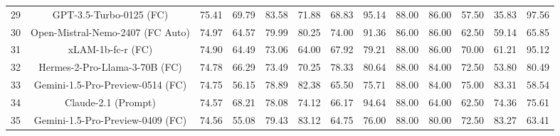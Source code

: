 \documentclass{article}
\begin{document}
\begin{table}[h]
{\begin{tabular}{ccccccccccccc}
29                     & GPT-3.5-Turbo-0125 (FC)                        & 75.41                         & 69.79  & 83.58    & 71.88    & 68.83                                                       & 95.14  & 88.00    & 86.00    & 57.50                                                       & 35.83                         & 97.56                       \\
30                     & Open-Mistral-Nemo-2407 (FC Auto)               & 74.97                         & 64.57  & 79.99    & 80.25    & 74.00                                                       & 91.36  & 86.00    & 86.00    & 62.50                                                       & 59.14                         & 65.85                       \\
31                     & xLAM-1b-fc-r (FC)                              & 74.90                         & 64.49  & 73.06    & 64.00    & 67.92                                                       & 79.21  & 88.00    & 86.00    & 70.00                                                       & 61.21                         & 95.12                       \\
32                     & Hermes-2-Pro-Llama-3-70B (FC)                  & 74.78                         & 66.29  & 73.49    & 70.25    & 78.33                                                       & 80.64  & 88.00    & 84.00    & 72.50                                                       & 53.80                         & 80.49                       \\
33                     & Gemini-1.5-Pro-Preview-0514 (FC)               & 74.75                         & 56.15  & 78.89    & 82.38    & 65.50                                                       & 75.71  & 88.00    & 84.00    & 75.00                                                       & 83.31                         & 58.54                       \\
34                     & Claude-2.1 (Prompt)                            & 74.57                         & 68.21  & 78.08    & 74.12    & 66.17                                                       & 94.64  & 88.00    & 64.00    & 62.50                                                       & 74.36                         & 75.61                       \\
35                     & Gemini-1.5-Pro-Preview-0409 (FC)               & 74.56                         & 55.08  & 79.43    & 83.12    & 64.75                                                       & 76.00  & 88.00    & 80.00    & 72.50                                                       & 83.27                         & 63.41                       \\

\end{tabular}}
\end{table}
\end{document}
